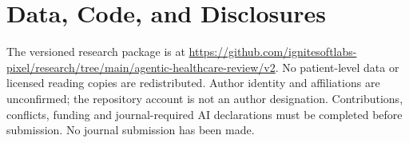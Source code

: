 \documentclass[journal,10pt]{IEEEtran}
\begin{document}
\section*{Data, Code, and Disclosures}
The versioned research package is at \url{https://github.com/ignitesoftlabs-pixel/research/tree/main/agentic-healthcare-review/v2}. No patient-level data or licensed reading copies are redistributed. Author identity and affiliations are unconfirmed; the repository account is not an author designation. Contributions, conflicts, funding and journal-required AI declarations must be completed before submission. No journal submission has been made.

\end{document}
